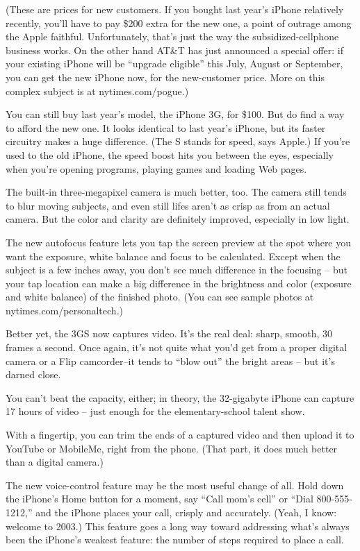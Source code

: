 ﻿\documentclass[12pt,a4paper,onecolumn]{article}
\begin{document}
(These are prices for new customers. If you bought last year's iPhone relatively recently, you'll
have to pay \$200 extra for the new one, a point of outrage among the Apple faithful. Unfortunately,
that's just the way the subsidized-cellphone business works. On the other hand AT\&T has just
announced a special offer: if your existing iPhone will be ``upgrade eligible'' this July, August or
September, you can get the new iPhone now, for the new-customer price. More on this complex subject
is at nytimes.com/pogue.)

You can still buy last year's model, the iPhone 3G, for \$100. But do find a way to afford the new
one. It looks identical to last year's iPhone, but its faster circuitry makes a huge difference.
(The S stands for speed, says Apple.) If you're used to the old iPhone, the speed boost hits you
between the eyes, especially when you're opening programs, playing games and loading Web pages.

The built-in three-megapixel camera is much better, too. The camera still tends to blur moving
subjects, and even still lifes aren't as crisp as from an actual camera. But the color and clarity
are definitely improved, especially in low light.

The new autofocus feature lets you tap the screen preview at the spot where you want the exposure,
white balance and focus to be calculated. Except when the subject is a few inches away, you don't
see much difference in the focusing -- but your tap location can make a big difference in the
brightness and color (exposure and white balance) of the finished photo. (You can see sample photos
at nytimes.com/personaltech.)

Better yet, the 3GS now captures video. It's the real deal: sharp, smooth, 30 frames a second. Once
again, it's not quite what you'd get from a proper digital camera or a Flip camcorder--it tends to
``blow out'' the bright areas -- but it's darned close.

You can't beat the capacity, either; in theory, the 32-gigabyte iPhone can capture 17 hours of video
-- just enough for the elementary-school talent show.

With a fingertip, you can trim the ends of a captured video and then upload it to YouTube or
MobileMe, right from the phone. (That part, it does much better than a digital camera.)

The new voice-control feature may be the most useful change of all. Hold down the iPhone's Home
button for a moment, say ``Call mom's cell'' or ``Dial 800-555-1212,'' and the iPhone places your
call, crisply and accurately. (Yeah, I know: welcome to 2003.) This feature goes a long way toward
addressing what's always been the iPhone's weakest feature: the number of steps required to place a
call.
\end{document}
